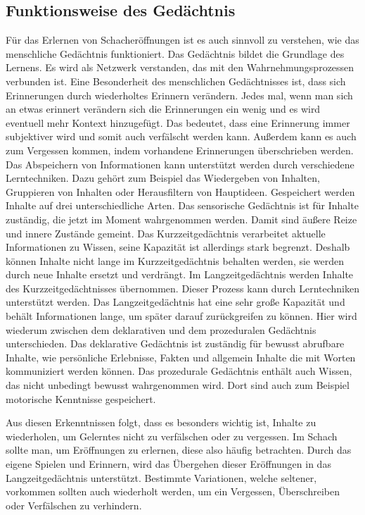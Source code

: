 \subsection{Funktionsweise des Gedächtnis}\label{gedächtnis}
Für das Erlernen von Schacheröffnungen ist es auch sinnvoll zu verstehen, wie das menschliche Gedächtnis funktioniert. Das Gedächtnis bildet die Grundlage des Lernens. Es wird als Netzwerk verstanden, das mit den Wahrnehmungsprozessen verbunden ist. Eine Besonderheit des menschlichen Gedächtnisses ist, dass sich Erinnerungen durch wiederholtes Erinnern verändern. Jedes mal, wenn man sich an etwas erinnert verändern sich die Erinnerungen ein wenig und es wird eventuell mehr Kontext hinzugefügt. Das bedeutet, dass eine Erinnerung immer subjektiver wird und somit auch verfälscht werden kann. Außerdem kann es auch zum Vergessen kommen, indem vorhandene Erinnerungen überschrieben werden. Das Abspeichern von Informationen kann unterstützt werden durch verschiedene Lerntechniken. Dazu gehört zum Beispiel das Wiedergeben von Inhalten, Gruppieren von Inhalten oder Herausfiltern von Hauptideen. Gespeichert werden Inhalte auf drei unterschiedliche Arten. Das sensorische Gedächtnis ist für Inhalte zuständig, die jetzt im Moment wahrgenommen werden. Damit sind äußere Reize und innere Zustände gemeint. Das Kurzzeitgedächtnis verarbeitet aktuelle Informationen zu Wissen, seine Kapazität ist allerdings stark begrenzt. Deshalb können Inhalte nicht lange im Kurzzeitgedächtnis behalten werden, sie werden durch neue Inhalte ersetzt und verdrängt. Im Langzeitgedächtnis werden Inhalte des Kurzzeitgedächtnisses übernommen. Dieser Prozess kann durch Lerntechniken unterstützt werden. Das Langzeitgedächtnis hat eine sehr große Kapazität und behält Informationen lange, um später darauf zurückgreifen zu können. Hier wird wiederum zwischen dem deklarativen und dem prozeduralen Gedächtnis unterschieden. Das deklarative Gedächtnis ist zuständig für bewusst abrufbare Inhalte, wie persönliche Erlebnisse, Fakten und allgemein Inhalte die mit Worten kommuniziert werden können. Das prozedurale Gedächtnis enthält auch Wissen, das nicht unbedingt bewusst wahrgenommen wird. Dort sind auch zum Beispiel motorische Kenntnisse gespeichert.
\cite{kron_grundwissen_2024}

Aus diesen Erkenntnissen folgt, dass es besonders wichtig ist, Inhalte zu wiederholen, um Gelerntes nicht zu verfälschen oder zu vergessen. Im Schach sollte man, um Eröffnungen zu erlernen, diese also häufig betrachten. Durch das eigene Spielen und Erinnern, wird das Übergehen dieser Eröffnungen in das Langzeitgedächtnis unterstützt. Bestimmte Variationen, welche seltener, vorkommen sollten auch wiederholt werden, um ein Vergessen, Überschreiben oder Verfälschen zu verhindern.

